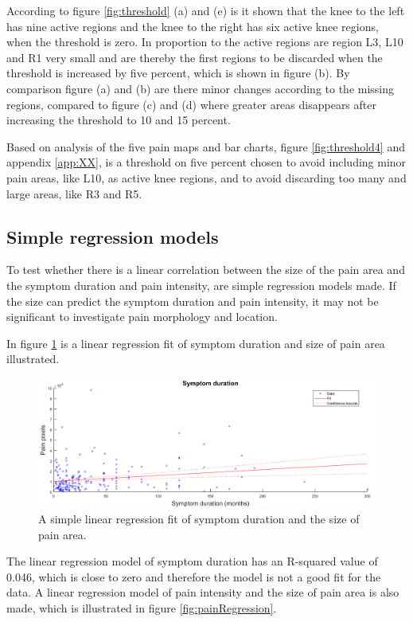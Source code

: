 \noindent
According to figure \ref{fig:threshold} (a) and (e) is it shown that the knee to the left has nine active regions and the knee to the right has six active knee regions, when the threshold is zero. In proportion to the active regions are region L3, L10 and R1 very small and are thereby the first regions to be discarded when the threshold is increased by five percent, which is shown in figure (b). 
By comparison figure (a) and (b) are there minor changes according to the missing regions, compared to figure (c) and (d) where greater areas disappears after increasing the threshold to 10 and 15 percent. 

Based on analysis of the five pain maps and bar charts, figure \ref{fig:threshold4} and appendix \ref{app:XX}, is a threshold on five percent chosen to avoid including minor pain areas, like L10, as active knee regions, and to avoid discarding too many and large areas, like R3 and R5.


\subsection{Simple regression models}
To test whether there is a linear correlation between the size of the pain area and the symptom duration and pain intensity, are simple regression models made. If the size can predict the symptom duration and pain intensity, it may not be significant to investigate pain morphology and location.

In figure \ref{fig:durationRegression} is a linear regression fit of symptom duration and size of pain area illustrated. 

\begin{figure} [H]
\centering
\includegraphics[width=1\textwidth]{figures/durationRegression}
\caption{A simple linear regression fit of symptom duration and the size of pain area.}
\label{fig:durationRegression}
\end{figure}

\noindent
The linear regression model of symptom duration has an R-squared value of 0.046, which is close to zero and therefore the model is not a good fit for the data. 
A linear regression model of pain intensity and the size of pain area is also made, which is illustrated in figure \ref{fig:painRegression}.

